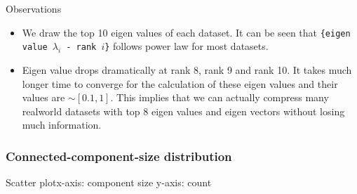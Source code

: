Observations
\begin{itemize}
\item We draw the top 10 eigen values of each dataset. It can be seen that \texttt{\{eigen value $\lambda_i$ - rank $i$\}} follows power law for most datasets.
\item Eigen value drops dramatically at rank 8, rank 9 and rank 10. It takes much longer time to converge for the calculation of these eigen values and their values are $\sim [0.1, 1]$. This implies that we can actually compress many realworld datasets with top 8 eigen values and eigen vectors without losing much information.
\end{itemize}

\subsubsection{Connected-component-size distribution}

Scatter plot\quad x-axis: component size \quad y-axis: count

